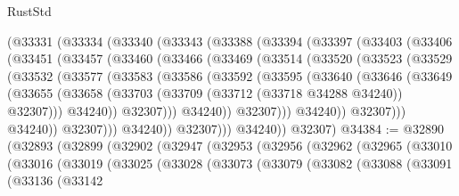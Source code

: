 \begin{lexlean}{RustStd}
\begin{coremodule}
    (@33331
      (@33334
        (@33340
          (@33343
            (@33388
              (@33394
                (@33397
                  (@33403
                    (@33406
                      (@33451
                        (@33457
                          (@33460
                            (@33466
                              (@33469
                                (@33514
                                  (@33520
                                    (@33523
                                      (@33529
                                        (@33532
                                          (@33577
                                            (@33583
                                              (@33586
                                                (@33592
                                                  (@33595
                                                    (@33640
                                                      (@33646
                                                        (@33649
                                                          (@33655
                                                            (@33658
                                                              (@33703
                                                                (@33709
                                                                  (@33712 (@33718 @34288 @34240))
                                                                  @32307)))
                                                            @34240))
                                                        @32307)))
                                                  @34240))
                                              @32307)))
                                        @34240))
                                    @32307)))
                              @34240))
                          @32307)))
                    @34240))
                @32307)))
          @34240))
      @32307)
@34384 := @32890
    (@32893
      (@32899
        (@32902
          (@32947
            (@32953
              (@32956
                (@32962
                  (@32965
                    (@33010
                      (@33016
                        (@33019
                          (@33025
                            (@33028
                              (@33073
                                (@33079
                                  (@33082
                                    (@33088
                                      (@33091
                                        (@33136
                                          (@33142

\end{coremodule}
\end{lexlean}
